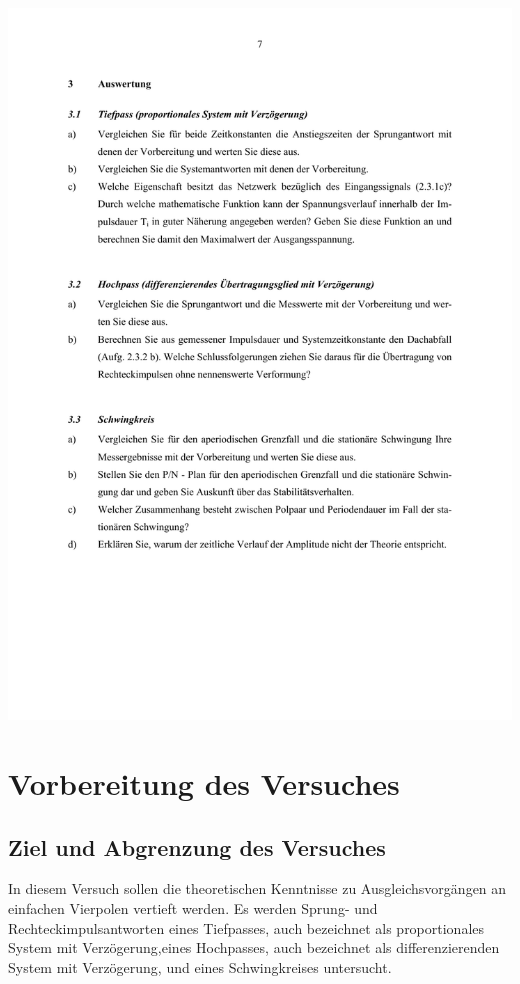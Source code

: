 \includegraphics[width=1.0\textwidth]{Bilder/Grundubertragungsglieder im Zeitbereich (verschoben) 7}\newpage


\section{Vorbereitung des Versuches}

\subsection{Ziel und Abgrenzung des Versuches}

In diesem Versuch sollen die theoretischen Kenntnisse zu Ausgleichsvorgängen an 
einfachen Vierpolen vertieft werden. Es werden Sprung- und Rechteckimpulsantworten eines 
Tiefpasses, auch bezeichnet als proportionales System mit Verzögerung,eines Hochpasses, 
auch bezeichnet als differenzierenden System mit Verzögerung, und eines Schwingkreises untersucht.\\
\newline

